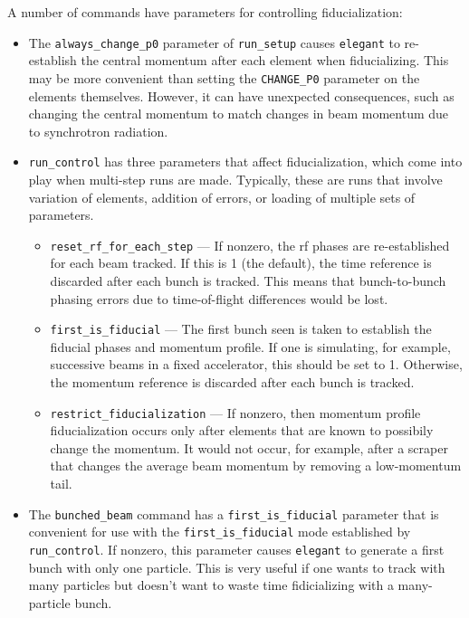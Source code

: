 \documentclass[11pt]{article}
\begin{document}
A number of commands have parameters for controlling fiducialization:
\begin{itemize}
\item The \verb|always_change_p0| parameter of \verb|run_setup| causes
	\verb|elegant| to re-establish the central momentum after each
	element when fiducializing.  This may be more convenient than
	setting the \verb|CHANGE_P0| parameter on the elements themselves.
	However, it can have unexpected consequences, such as changing the
	central momentum to match changes in beam momentum due to synchrotron
	radiation.
\item \verb|run_control| has three parameters that affect fiducialization,
	which come into play when multi-step runs are made.  Typically, these
	are runs that involve variation of elements, addition of errors,
	or loading of multiple sets of parameters.
	\begin{itemize}
	\item \verb|reset_rf_for_each_step| --- If nonzero, the rf phases are 
	re-established
	for each beam tracked.  If this is 1 (the default), 
	the time reference is discarded after each bunch is tracked.
	This means that bunch-to-bunch phasing errors due to time-of-flight 
	differences would be lost.  
	\item \verb|first_is_fiducial| --- The first bunch seen is taken to
	establish the fiducial phases and momentum profile.  If one is simulating,
	for example, successive beams in a fixed accelerator, this should be set
	to 1.  Otherwise, the momentum reference is discarded after each bunch
	is tracked.
	\item \verb|restrict_fiducialization| --- If nonzero, then momentum profile
	fiducialization occurs only after elements that are known to possibily
	change the momentum. It would not occur, for example, after a scraper that
	changes the average beam momentum by removing a low-momentum tail.
	\end{itemize}
\item The \verb|bunched_beam| command has a \verb|first_is_fiducial| parameter
	that is convenient for use with the \verb|first_is_fiducial| mode
	established by \verb|run_control|.  If nonzero, this parameter causes
	\verb|elegant| to generate a first bunch with only one particle.
	This is very useful if one wants to track with many particles but doesn't
	want to waste time fidicializing with a many-particle bunch.
\end{itemize}
\end{document}
